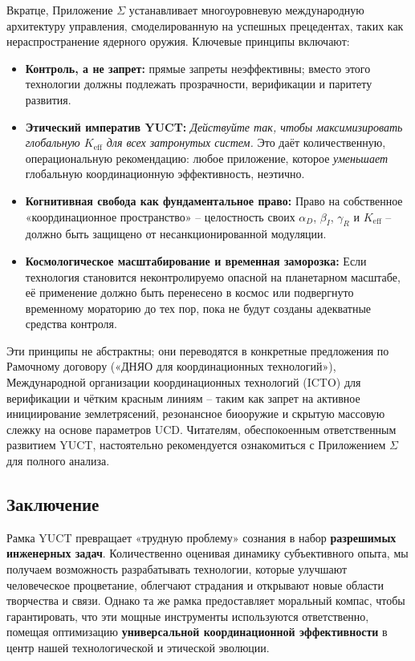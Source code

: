 \documentclass[12pt,a4paper]{article}
\begin{document}
	Вкратце, Приложение \(\Sigma\) устанавливает многоуровневую международную архитектуру управления, смоделированную на успешных прецедентах, таких как нераспространение ядерного оружия. Ключевые принципы включают:
	\begin{itemize}
		\item \textbf{Контроль, а не запрет:} прямые запреты неэффективны; вместо этого технологии должны подлежать прозрачности, верификации и паритету развития.
		\item \textbf{Этический императив YUCT:} \textit{Действуйте так, чтобы максимизировать глобальную \(K_{\mathrm{eff}}\) для всех затронутых систем.} Это даёт количественную, операциональную рекомендацию: любое приложение, которое \textit{уменьшает} глобальную координационную эффективность, неэтично.
		\item \textbf{Когнитивная свобода как фундаментальное право:} Право на собственное «координационное пространство» – целостность своих \(\alpha_D\), \(\beta_I\), \(\gamma_R\) и \(K_{\mathrm{eff}}\) – должно быть защищено от несанкционированной модуляции.
		\item \textbf{Космологическое масштабирование и временная заморозка:} Если технология становится неконтролируемо опасной на планетарном масштабе, её применение должно быть перенесено в космос или подвергнуто временному мораторию до тех пор, пока не будут созданы адекватные средства контроля.
	\end{itemize}
	
	Эти принципы не абстрактны; они переводятся в конкретные предложения по Рамочному договору («ДНЯО для координационных технологий»), Международной организации координационных технологий (ICTO) для верификации и чётким красным линиям – таким как запрет на активное инициирование землетрясений, резонансное биооружие и скрытую массовую слежку на основе параметров UCD. Читателям, обеспокоенным ответственным развитием YUCT, настоятельно рекомендуется ознакомиться с Приложением \(\Sigma\) для полного анализа.
	
	\subsection{Заключение}
	Рамка YUCT превращает «трудную проблему» сознания в набор \textbf{разрешимых инженерных задач}. Количественно оценивая динамику субъективного опыта, мы получаем возможность разрабатывать технологии, которые улучшают человеческое процветание, облегчают страдания и открывают новые области творчества и связи. Однако та же рамка предоставляет моральный компас, чтобы гарантировать, что эти мощные инструменты используются ответственно, помещая оптимизацию \textbf{универсальной координационной эффективности} в центр нашей технологической и этической эволюции.
	
\end{document}
